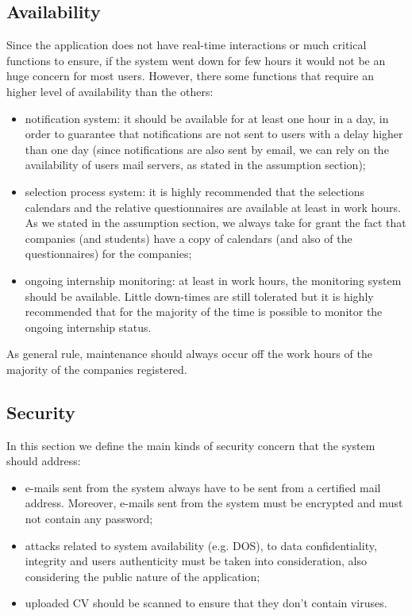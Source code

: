 		\subsection{Availability}
			Since the application does not have real-time interactions or much critical functions to ensure, if the system went down for few hours it would not be an huge concern for most users. However, there some functions that require an higher level of availability than the others:
			\begin{itemize}
				\item notification system: it should be available for at least one hour in a day, in order to guarantee that notifications are not sent to users with a delay higher than one day (since notifications are also sent by email, we can rely on the availability of users mail servers, as stated in the assumption section);
				\item selection process system: it is highly recommended that the selections calendars and the relative questionnaires are available at least in work hours. As we stated in the assumption section, we always take for grant the fact that companies (and students) have a copy of calendars (and also of the questionnaires) for the companies;
				\item ongoing internship monitoring: at least in work hours, the monitoring system should be available. Little down-times are still tolerated but it is highly recommended that for the majority of the time is possible to monitor the ongoing internship status.
			\end{itemize}
			As general rule, maintenance should always occur off the work hours of the majority of the companies registered.
		\subsection{Security}
			In this section we define the main kinds of security concern that the system should address:
			\begin{itemize}
				\item e-mails sent from the system always have to be sent from a certified mail address. Moreover, e-mails sent from the system must be encrypted and must not contain any password;
				\item attacks related to system availability (e.g. DOS), to data confidentiality, integrity and users authenticity must be taken into consideration, also considering the public nature of the application;
				\item uploaded CV should be scanned to ensure that they don't contain viruses.
			\end{itemize}
